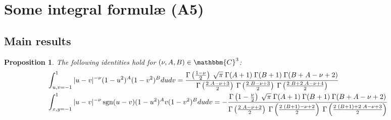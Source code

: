 \documentclass{article}
\newcommand{\tmop}[1]{\ensuremath{\operatorname{#1}}}
\newtheorem{proposition}{Proposition}[section]
\theoremstyle{remark}
\begin{document}
\section{Some integral formul{\ae} (A5)}\label{sec:intform}

\subsection{Main results}

\begin{proposition}
  \label{intform:prop-nuAB}The following identities hold for $(\nu, A, B) \in
  \mathbbm{C}^3$:
  \begin{eqnarray}
    & \int_{u, v = - 1}^1 | u - v |^{- \nu} (1 - u^2)^A (1 - v^2)^B d u d v =
    \frac{\Gamma \left( \frac{1 - \nu}{2} \right) \hspace{0.25em} \sqrt{\pi} 
    \hspace{0.25em} \Gamma (A + 1)  \hspace{0.25em} \Gamma (B + 1) 
    \hspace{0.25em} \Gamma (B + A - \nu + 2)}{\Gamma \left( \frac{2
    \hspace{0.25em} A - \nu + 3}{2} \right)  \hspace{0.25em} \Gamma \left(
    \frac{2 \hspace{0.25em} B - \nu + 3}{2} \right)  \hspace{0.25em} \Gamma
    \left( \frac{2 \hspace{0.25em} B + 2 \hspace{0.25em} A - \nu + 4}{2}
    \right)} &  \nonumber\\
    & \int_{x, y = - 1}^1 | u - v |^{- \nu} \tmop{sgn} (u - v) (1 - u^2)^A v
    (1 - v^2)^B d u d v = - \frac{\Gamma \left( 1 - \frac{\nu}{2} \right) 
    \hspace{0.25em} \sqrt{\pi}  \hspace{0.25em} \Gamma (A + 1) 
    \hspace{0.25em} \Gamma (B + 1)  \hspace{0.25em} \Gamma (B + A - \nu +
    2)}{\Gamma \left( \frac{2 \hspace{0.25em} A - \nu + 2}{2} \right) 
    \hspace{0.25em} \Gamma \left( \frac{2 \hspace{0.25em} (B + 1) - \nu +
    2}{2} \right)  \hspace{0.25em} \Gamma \left( \frac{2 \hspace{0.25em} (B +
    1) + 2 \hspace{0.25em} A - \nu + 3}{2} \right)} &  \nonumber
  \end{eqnarray}
\end{proposition}
\end{document}
